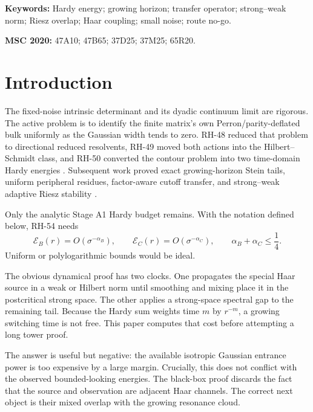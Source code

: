 \documentclass[11pt]{article}
\theoremstyle{remark}
\newcommand{\cE}{\mathcal E}
\begin{document}
\noindent\textbf{Keywords:} Hardy energy; growing horizon; transfer operator;
strong--weak norm; Riesz overlap; Haar coupling; small noise; route no-go.

\medskip
\noindent\textbf{MSC 2020:} 47A10; 47B65; 37D25; 37M25; 65R20.

\section{Introduction}

The fixed-noise intrinsic determinant and its dyadic continuum limit are
rigorous.  The active problem is to identify the finite matrix's own
Perron/parity-deflated bulk uniformly as the Gaussian width tends to zero.
RH-48 reduced that problem to directional reduced resolvents, RH-49 moved
both actions into the Hilbert--Schmidt class, and RH-50 converted the
contour problem into two time-domain Hardy energies
\citep{WangIntrinsic2026,WangDirectional2026,WangHardy2026}.  Subsequent
work proved exact growing-horizon Stein tails, uniform peripheral residues,
factor-aware cutoff transfer, and strong--weak adaptive Riesz stability
\citep{WangStructuredStein2026,WangFactorTransfer2026,
WangHardyTail2026,WangFactorAware2026,WangRieszCutoff2026}.

Only the analytic Stage A1 Hardy budget remains.  With the notation defined
below, RH-54 needs
\begin{equation}
 \cE_B(r)=O(\sigma^{-\alpha_B}),
 \qquad
 \cE_C(r)=O(\sigma^{-\alpha_C}),
 \qquad
 \alpha_B+\alpha_C\le\frac14.
 \label{eq:rh54-budget}
\end{equation}
Uniform or polylogarithmic bounds would be ideal.

The obvious dynamical proof has two clocks.  One propagates the special Haar
source in a weak or Hilbert norm until smoothing and mixing place it in the
postcritical strong space.  The other applies a strong-space spectral gap to
the remaining tail.  Because the Hardy sum weights time $m$ by $r^{-m}$, a
growing switching time is not free.  This paper computes that cost before
attempting a long tower proof.

The answer is useful but negative: the available isotropic Gaussian entrance
power is too expensive by a large margin.  Crucially, this does not conflict
with the observed bounded-looking energies.  The black-box proof discards
the fact that the source and observation are adjacent Haar channels.  The
correct next object is their mixed overlap with the growing resonance cloud.
\end{document}
